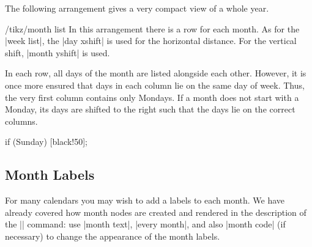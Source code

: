 The following arrangement gives a very compact view of a whole year.
\begin{stylekey}{/tikz/month list}
  In this arrangement there is a row for each month. As for the
  |week list|, the |day xshift| is used for the horizontal distance.
  For the vertical shift, |month yshift| is used.

  In each row, all days of the month are listed alongside each
  other. However, it is once more ensured that days in each column lie
  on the same day of week. Thus, the very first column contains only
  Mondays. If a month does not start with a Monday, its days are
  shifted to the right such that the days lie on the correct columns.
\begin{codeexample}[]
\sffamily\scriptsize
\tikz
  \calendar [dates=2000-01-01 to 2000-12-31,
             month list,month label left,month yshift=1.25em]
            if (Sunday) [black!50];
\end{codeexample}
\end{stylekey}

\subsection{Month Labels}

For many calendars you may wish to add a labels to each month. We have
already covered how month nodes are created and rendered in the
description of the |\calendar| command: use |month text|,
|every month|, and also |month code| (if necessary) to change the
appearance of the month labels.

